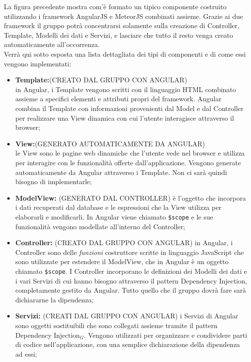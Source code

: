 La figura precedente mostra com'è formato un tipico componente costruito utilizzando i framework AngularJS e MeteorJS combinati assieme. Grazie ai due framework il gruppo potrà concentrarsi solamente sulla creazione di Controller, Template, Modelli dei dati e Servizi, e lasciare che tutto il resto venga creato automaticamente all'occorrenza. \\
Verrà qui sotto esposta una lista dettagliata dei tipi di componenti e di come essi vengono implementati:
\begin{itemize}
\item \textbf{Template:}(CREATO DAL GRUPPO CON ANGULAR)\\ in Angular, i Template vengono scritti con il linguaggio HTML combinato assieme a specifici elementi e attributi propri del framework. Angular combina il Template con informazioni provenienti dal Model e dal Controller per realizzare una View dinamica con cui l'utente interagisce attraverso il browser;
\item \textbf{View:}(GENERATO AUTOMATICAMENTE DA ANGULAR)\\ le View sono le pagine web dinamiche che l'utente vede nel browser e utilizza per interagire con le funzionalità offerte dall'applicazione. Vengono generate automaticamente da Angular attraverso i Template. Non ci sarà quindi bisogno di implementarle;
\item \textbf{ModelView:} (GENERATO DAL CONTROLLER) è l'oggetto che incorpora i dati recuperati dal database e le espressioni che la View utilizza per elaborarli e modificarli. In Angular viene chiamato \texttt{\$scope} e le sue funzionalità vengono modellate all'interno del Controller; 
\item \textbf{Controller:} (CREATO DAL GRUPPO CON ANGULAR) in Angular, i Controller sono delle \textit{funzioni} costruttore scritte in linguaggio JavaScript che sono utilizzate per estendere il ModelView, che in Angular è un oggetto chiamato \texttt{\$scope}. I Controller incorporano le definizioni dei Modelli dei dati e i vari Servizi di cui hanno bisogno attraverso il pattern Dependency Injection, completamente gestito da Angular. Tutto quello che il gruppo dovrà fare sarà dichiararne la dipendenza;
\item \textbf{Servizi:} (CREATI DAL GRUPPO CON ANGULAR) i Servizi di Angular sono oggetti sostituibili che sono collegati assieme tramite il pattern Dependency Injection$_G$. Vengono utilizzati per organizzare e condividere parti di codice nell'applicazione, con una semplice dichiarazione della dipendenza ad essi;

\end{itemize}
